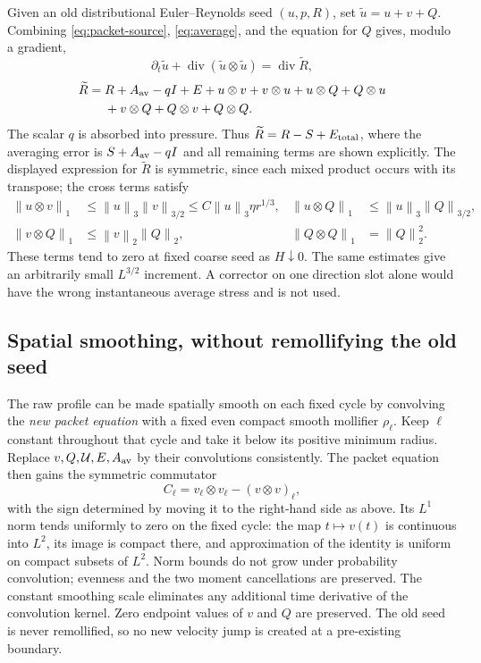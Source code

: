 \documentclass[11pt]{article}
\theoremstyle{remark}\newtheorem{remark}[theorem]{Remark}
\newcommand{\Div}{\operatorname{div}}
\newcommand{\norm}[2]{\left\|#1\right\|_{#2}}
\begin{document}
Given an old distributional Euler--Reynolds seed $(u,p,R)$, set $\widetilde u=u+v+Q$.
Combining \eqref{eq:packet-source}, \eqref{eq:average}, and the equation for
$Q$ gives, modulo a gradient,
\[
 \partial_t\widetilde u+\Div(\widetilde u\otimes\widetilde u)
 =\Div\widetilde R,
\]
\begin{align*}
 \widetilde R={}&R+A_{\rm av}-qI+E
 +u\otimes v+v\otimes u+u\otimes Q+Q\otimes u\\
 &+v\otimes Q+Q\otimes v+Q\otimes Q.
\end{align*}
The scalar $q$ is absorbed into pressure. Thus $\widetilde R=R-S+E_{\rm total}$,
where the averaging error is $S+A_{\rm av}-qI$ and all remaining terms are
shown explicitly. The displayed expression for $\widetilde R$ is symmetric, since each mixed product occurs with its transpose;
the cross terms satisfy
\begin{align*}
 \norm{u\otimes v}1&\leq\norm u3\norm v{3/2}
 \leq C\norm u3\eta r^{1/3},&
 \norm{u\otimes Q}1&\leq\norm u3\norm Q{3/2},\\
 \norm{v\otimes Q}1&\leq\norm v2\norm Q2,&
 \norm{Q\otimes Q}1&=\norm Q2^2.
\end{align*}
These terms tend to zero at fixed coarse seed as $H\downarrow0$.
The same estimates give an arbitrarily small $L^{3/2}$ increment.
A corrector on one direction slot alone would have the wrong instantaneous
average stress and is not used.

\subsection{Spatial smoothing, without remollifying the old seed}
The raw profile can be made spatially smooth on each fixed cycle by convolving
the \emph{new packet equation} with a fixed even compact smooth mollifier
$\rho_\ell$. Keep $\ell$ constant throughout that cycle and take it below its
positive minimum radius. Replace $v,Q,\mathcal U,E,A_{\rm av}$ by their
convolutions consistently. The packet equation then gains the symmetric
commutator
\[
 C_\ell=v_\ell\otimes v_\ell-(v\otimes v)_\ell,
\]
with the sign determined by moving it to the right-hand side as above.
Its $L^1$ norm tends uniformly to zero on the fixed cycle: the map
$t\mapsto v(t)$ is continuous into $L^2$, its image is compact there, and
approximation of the identity is uniform on compact subsets of $L^2$.
Norm bounds do not grow under probability convolution; evenness and the two
moment cancellations are preserved. The constant smoothing scale eliminates
any additional time derivative of the convolution kernel. Zero endpoint
values of $v$ and $Q$ are preserved. The old seed is never remollified, so no
new velocity jump is created at a pre-existing boundary.
\end{document}
